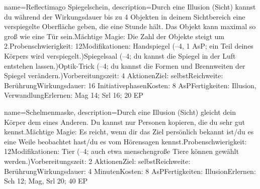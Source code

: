 {
    name={Reflectimago Spiegelschein},
    description={Durch eine Illusion (Sicht) kannst du während der Wirkungsdauer bis zu 4 Objekten in deinem Sichtbereich eine verspiegelte Oberfläche geben, die eine Stunde hält. Das Objekt kann maximal so groß wie eine Tür sein.\newline Mächtige Magie: Die Zahl der Objekte steigt um 2.\newline Probenschwierigkeit: 12\newline Modifikationen: Handspiegel (–4, 1 AsP; ein Teil deines Körpers wird verspiegelt.)\newline Spiegelsaal (–4; du kannst die Spiegel in der Luft entstehen lassen.)\newline Optik-Trick (–4; du kannst die Formen und Brennweiten der Spiegel verändern.)\newline Vorbereitungszeit: 4 Aktionen\newline Ziel: selbst\newline Reichweite: Berührung\newline Wirkungsdauer: 16 Initiativephasen\newline Kosten: 8 AsP\newline Fertigkeiten: Illusion, Verwandlung\newline Erlernen: Mag 14; Srl 16; 20 EP}
}


{
    name={Schelmenmaske},
    description={Durch eine Illusion (Sicht) gleicht dein Körper dem eines Anderen. Du kannst nur Personen kopieren, die du sehr gut kennst.\newline Mächtige Magie: Es reicht, wenn dir das Ziel persönlich bekannt ist/du es eine Weile beobachtet hast/du es vom Hörensagen kennst.\newline Probenschwierigkeit: 12\newline Modifikationen: Tier (–4; auch etwa menschengroße Tiere können gewählt werden.)\newline Vorbereitungszeit: 2 Aktionen\newline Ziel: selbst\newline Reichweite: Berührung\newline Wirkungsdauer: 4 Minuten\newline Kosten: 8 AsP\newline Fertigkeiten: Illusion\newline Erlernen: Sch 12; Mag, Srl 20; 40 EP}
}


